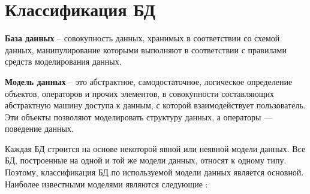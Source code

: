 
\newpage





\section{Классификация БД}
\textbf{База данных} -- совокупность данных, хранимых в соответствии со схемой данных, манипулирование которыми выполняют в соответствии с правилами средств моделирования данных. \cite{gost10032db}

\textbf{Модель данных} -- это абстрактное, самодостаточное, логическое определение объектов, операторов и прочих элементов, в совокупности составляющих абстрактную машину доступа к данным, с которой взаимодействует пользователь. Эти объекты позволяют моделировать структуру данных, а операторы — поведение данных. \cite{дейт2008введение}


Каждая БД строится на основе некоторой явной или неявной модели данных. Все БД, построенные на одной и той же модели данных, относят к одному типу. Поэтому, классификация БД по используемой модели данных является основной. Наиболее известными моделями являются следующие \cite{watt2014database}:

